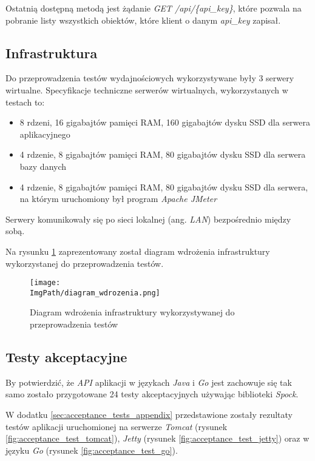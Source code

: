 Ostatnią dostępną metodą jest żądanie \textsl{GET /api/\{api\_key\}}, które pozwala na pobranie listy wszystkich obiektów, które klient o danym \textsl{api\_key} zapisał.


\newpage
\subsection{Infrastruktura}
Do przeprowadzenia testów wydajnościowych wykorzystywane były 3 serwery wirtualne. Specyfikacje techniczne serwerów wirtualnych, wykorzystanych w testach to: 
\begin{itemize}
    \item 8 rdzeni, 16 gigabajtów pamięci RAM, 160 gigabajtów dysku SSD dla serwera aplikacyjnego
    \item 4 rdzenie, 8 gigabajtów pamięci RAM, 80 gigabajtów dysku SSD dla serwera bazy danych 
    \item 4 rdzenie, 8 gigabajtów pamięci RAM, 80 gigabajtów dysku SSD dla serwera, na którym uruchomiony był program \textsl{Apache JMeter}
\end{itemize}
Serwery komunikowały się po sieci lokalnej (ang. \textsl{LAN}) bezpośrednio między sobą.

Na rysunku \ref{fig:deployment_diagram} zaprezentowany został diagram wdrożenia infrastruktury wykorzystanej do przeprowadzenia testów.
\begin{figure}[!ht]
\centering
\texttt{[image: \\ImgPath/diagram\_wdrozenia.png]}
\caption{Diagram wdrożenia infrastruktury wykorzystywanej do przeprowadzenia testów}
\label{fig:deployment_diagram}
\end{figure}
\subsection{Testy akceptacyjne} 

By potwierdzić, że \textsl{API} aplikacji w językach \textsl{Java} i \textsl{Go} jest zachowuje się tak samo zostało przygotowane 24 testy akceptacyjnych używając biblioteki \textsl{Spock}. 

W dodatku \ref{sec:acceptance_tests_appendix} przedstawione zostały rezultaty testów aplikacji uruchomionej na serwerze \textsl{Tomcat} (rysunek \ref{fig:acceptance_test_tomcat}), \textsl{Jetty} (rysunek \ref{fig:acceptance_test_jetty}) oraz w języku \textsl{Go} (rysunek \ref{fig:acceptance_test_go}).

